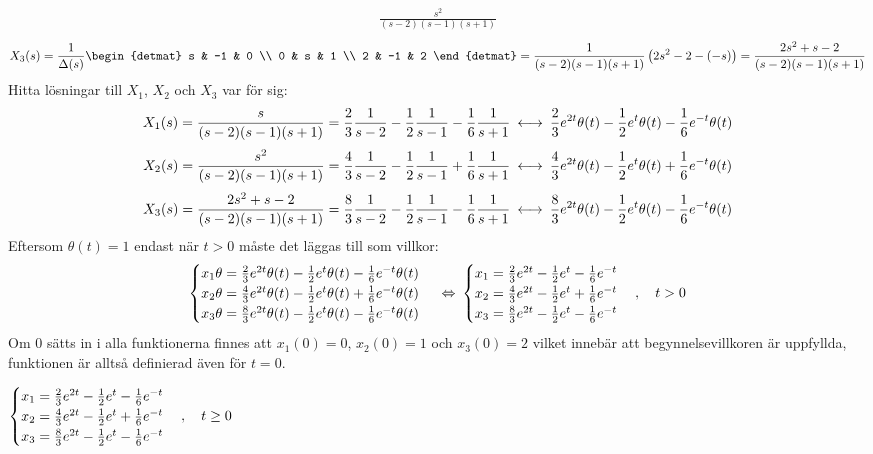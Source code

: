 \begin{task}{5.17}
\begin{align*}
	\frac{s^2}{(s-2)(s-1)(s+1)}
	\end{align*}
	\begin{align*}
	X_3(s)=
	\frac{1}{\Delta(s)}\begin{detmat}
	s & -1 & 0 \\
	0 & s & 1 \\
	2 & -1 & 2
	\end{detmat}=
	\frac{1}{(s-2)(s-1)(s+1)}\left(2s^2-2-(-s)\right)=
	\frac{2s^2+s-2}{(s-2)(s-1)(s+1)}
	\end{align*}
	Hitta lösningar till $X_1$, $X_2$ och $X_3$ var för sig: 
	\begin{align*}
	X_1(s)=
	\frac{s}{(s-2)(s-1)(s+1)}=
	\frac{2}{3}\*\frac{1}{s-2}-\frac{1}{2}\*\frac{1}{s-1}-\frac{1}{6}\*\frac{1}{s+1} \llra
	\frac{2}{3}e^{2t}\theta(t)-\frac{1}{2}e^{t}\theta(t)-\frac{1}{6}e^{-t}\theta(t)
	\end{align*}
	\begin{align*}
	X_2(s)=
	\frac{s^2}{(s-2)(s-1)(s+1)}=
	\frac{4}{3}\*\frac{1}{s-2}-\frac{1}{2}\*\frac{1}{s-1}+\frac{1}{6}\*\frac{1}{s+1} \llra
	\frac{4}{3}e^{2t}\theta(t)-\frac{1}{2}e^{t}\theta(t)+\frac{1}{6}e^{-t}\theta(t)
	\end{align*}
	\begin{align*}
	X_3(s)=
	\frac{2s^2+s-2}{(s-2)(s-1)(s+1)}=
	\frac{8}{3}\*\frac{1}{s-2}-\frac{1}{2}\*\frac{1}{s-1}-\frac{1}{6}\*\frac{1}{s+1} \llra
	\frac{8}{3}e^{2t}\theta(t)-\frac{1}{2}e^{t}\theta(t)-\frac{1}{6}e^{-t}\theta(t)
	\end{align*}
	Eftersom $\theta(t)=1$ endast när $t>0$ måste det läggas till som villkor:
	\[\begin{cases}
	x_1\theta=\frac{2}{3}e^{2t}\theta(t)-\frac{1}{2}e^{t}\theta(t)-\frac{1}{6}e^{-t}\theta(t) \\
	x_2\theta=\frac{4}{3}e^{2t}\theta(t)-\frac{1}{2}e^{t}\theta(t)+\frac{1}{6}e^{-t}\theta(t) \\
	x_3\theta=\frac{8}{3}e^{2t}\theta(t)-\frac{1}{2}e^{t}\theta(t)-\frac{1}{6}e^{-t}\theta(t)
	\end{cases} \lra
	\begin{cases}
	x_1=\frac{2}{3}e^{2t}-\frac{1}{2}e^{t}-\frac{1}{6}e^{-t} \\
	x_2=\frac{4}{3}e^{2t}-\frac{1}{2}e^{t}+\frac{1}{6}e^{-t} \\
	x_3=\frac{8}{3}e^{2t}-\frac{1}{2}e^{t}-\frac{1}{6}e^{-t}
	\end{cases}\cond{t>0}\]
	Om 0 sätts in i alla funktionerna finnes att $x_1(0)=0$, $x_2(0)=1$ och $x_3(0)=2$ vilket innebär att begynnelsevillkoren är uppfyllda, funktionen är alltså definierad även för $t=0$.
	
	\ans 
	$\begin{cases}
	x_1=\frac{2}{3}e^{2t}-\frac{1}{2}e^{t}-\frac{1}{6}e^{-t} \\
	x_2=\frac{4}{3}e^{2t}-\frac{1}{2}e^{t}+\frac{1}{6}e^{-t} \\
	x_3=\frac{8}{3}e^{2t}-\frac{1}{2}e^{t}-\frac{1}{6}e^{-t}
	\end{cases}, \quad t\ge0$
\end{task}
